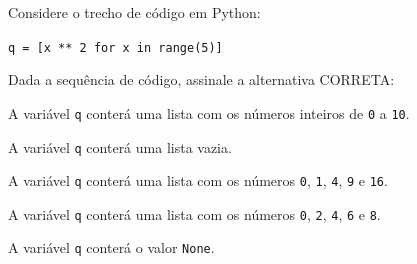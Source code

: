 
{%
\item \rtask \ponto{\pt} %
Considere o trecho de código em Python:

\lstinline[style=Python]|q = [x ** 2 for x in range(5)]|

Dada a sequência de código, assinale a alternativa CORRETA: 

\begin{answerlist}[label={\texttt{\Alph*}.},leftmargin=*]
    \ti A variável \lstinline[style=Python]|q| conterá uma lista com os números inteiros de \lstinline[style=Python]|0| a \lstinline[style=Python]|10|.
    
    \ti A variável \lstinline[style=Python]|q| conterá uma lista vazia.
    
    \di A variável \lstinline[style=Python]|q| conterá uma lista com os números \lstinline[style=Python]|0|, \lstinline[style=Python]|1|, \lstinline[style=Python]|4|, \lstinline[style=Python]|9| e \lstinline[style=Python]|16|.
    
    \ti A variável \lstinline[style=Python]|q| conterá uma lista com os números \lstinline[style=Python]|0|, \lstinline[style=Python]|2|, \lstinline[style=Python]|4|, \lstinline[style=Python]|6| e \lstinline[style=Python]|8|.
    
    \ti A variável \lstinline[style=Python]|q| conterá o valor \lstinline[style=Python]|None|.
\end{answerlist}

}
